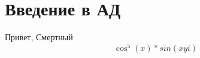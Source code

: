 \documentclass[12pt,a4paper]{article}
\begin{document}
\section{Введение в АД}      
Привет, Смертный
$$
\cos^5(x)*sin(xyi)
$$
\end{document}

